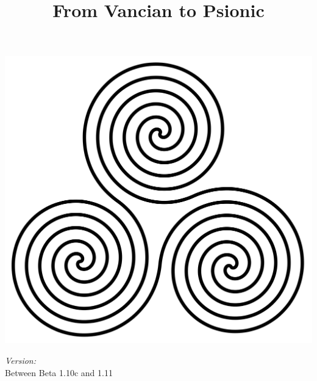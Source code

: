 \documentclass[a4paper,10pt]{article}
\title{From Vancian to Psionic}
\date{}
\author{}
\begin{document}
\begin{titlepage}
\maketitle
\thispagestyle{empty}
\includegraphics[width=\textwidth]{Pics/TripleSpiral.png}
\vfill
\begin{flushright} \large
\emph{Version:} \\
Between Beta 1.10c and 1.11
\end{flushright}
\end{titlepage}
\end{document}
